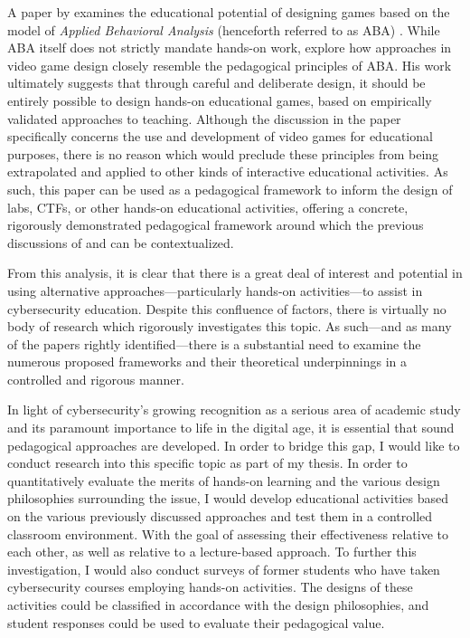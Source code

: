     A paper by \citeauthor{C-Linehan} examines the educational potential of designing games based on the model of \emph{Applied Behavioral Analysis} (henceforth referred to as ABA) \cite{C-Linehan}. While ABA itself does not strictly mandate hands-on work, \citeauthor{C-Linehan} explore how approaches in video game design closely resemble the pedagogical principles of ABA. His work ultimately suggests that through careful and deliberate design, it should be entirely possible to design hands-on educational games, based on empirically validated approaches to teaching. Although the discussion in the paper specifically concerns the use and development of video games for educational purposes, there is no reason which would preclude these principles from being extrapolated and applied to other kinds of interactive educational activities. As such, this paper can be used as a pedagogical framework to inform the design of labs, CTFs, or other hands-on educational activities, offering a concrete, rigorously demonstrated pedagogical framework around which the previous discussions of \citeauthor{J-Sweller} and \citeauthor{R-Weiss} can be contextualized. 



    From this analysis, it is clear that there is a great deal of interest and potential in using alternative approaches---particularly hands-on activities---to assist in cybersecurity education. Despite this confluence of factors, there is virtually no body of research which rigorously investigates this topic. As such---and as many of the papers rightly identified---there is a substantial need to examine the numerous proposed frameworks and their theoretical underpinnings in a controlled and rigorous manner. 

    In light of cybersecurity's growing recognition as a serious area of academic study and its paramount importance to life in the digital age, it is essential that sound pedagogical approaches are developed. In order to bridge this gap, I would like to conduct research into this specific topic as part of my thesis. In order to quantitatively evaluate the merits of hands-on learning and the various design philosophies surrounding the issue, I would develop educational activities based on the various previously discussed approaches and test them in a controlled classroom environment. With the goal of assessing their effectiveness relative to each other, as well as relative to a lecture-based approach. To further this investigation, I would also conduct surveys of former students who have taken cybersecurity courses employing hands-on activities. The designs of these activities could be classified in accordance with the design philosophies, and student responses could be used to evaluate their pedagogical value. 
